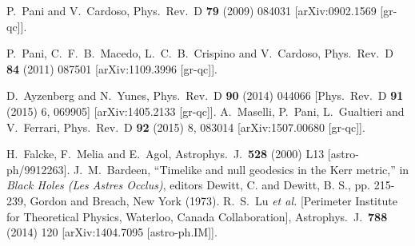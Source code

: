 \documentclass[12pt]{article}
\begin{document}
\begin{small}
\begin{thebibliography}{99}
  P.~Pani and V.~Cardoso,
  Phys.\ Rev.\  D {\bf 79} (2009) 084031
  [arXiv:0902.1569 [gr-qc]].

  P.~Pani, C.~F.~B.~Macedo, L.~C.~B.~Crispino and V.~Cardoso,
  Phys.\ Rev.\ D {\bf 84} (2011) 087501
  [arXiv:1109.3996 [gr-qc]].
		
  D.~Ayzenberg and N.~Yunes,
  Phys.\ Rev.\ D {\bf 90} (2014) 044066
   [Phys.\ Rev.\ D {\bf 91} (2015) 6,  069905]
  [arXiv:1405.2133 [gr-qc]].
  A.~Maselli, P.~Pani, L.~Gualtieri and V.~Ferrari,
  Phys.\ Rev.\ D {\bf 92} (2015) 8,  083014
  [arXiv:1507.00680 [gr-qc]].

  H.~Falcke, F.~Melia and E.~Agol,
  Astrophys.\ J.\  {\bf 528} (2000) L13
  [astro-ph/9912263].
  J.~M.~Bardeen,
  ``Timelike and null geodesics in the Kerr metric,''
	in 
{\it Black Holes (Les Astres Occlus)}, editors Dewitt, C. and Dewitt, B. S.,
pp. 215-239,  Gordon and Breach, New York (1973).
  R.~S.~Lu {\it et al.} [Perimeter Institute for Theoretical Physics, Waterloo, Canada Collaboration],
  Astrophys.\ J.\  {\bf 788} (2014) 120
  [arXiv:1404.7095 [astro-ph.IM]].


\end{thebibliography}
\end{small}
\end{document}

